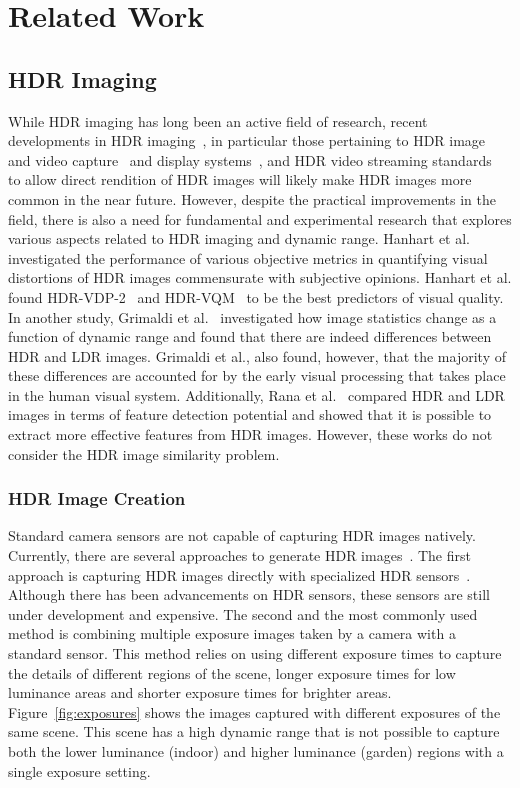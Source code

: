\chapter{Related Work}
\label{chp:b2}

\section{HDR Imaging}

While HDR imaging has long been an active field of research, recent developments in HDR imaging~\cite{Rein2010,Banterle2011,chalmers2016high}, in particular those pertaining to HDR image and video capture~\cite{tocci2011versatile,froehlich2014creating} and display systems~\cite{seetzen2004high}, and HDR
video streaming standards~\cite{standard2016dynamic} to allow direct rendition of HDR images will likely make HDR images more common in the near future. However, despite the practical improvements in the field, there is also a need for fundamental and experimental research that explores various aspects related to HDR imaging and dynamic range. Hanhart et al.~\cite{hanhart2015benchmarking} investigated the performance of various objective metrics in quantifying visual distortions of HDR images commensurate with subjective opinions. Hanhart et al. found HDR-VDP-2~\cite{mantiuk2011hdr} and HDR-VQM~\cite{narwaria2015hdr} to be the best predictors of visual quality. In another study, Grimaldi et al.~\cite{grimaldi2019statistics} investigated how image statistics change as a function of dynamic range and found that there are indeed differences between HDR and LDR images. Grimaldi et al., also found, however, that the majority of these differences are accounted for by the early visual processing that takes place in the human visual system. Additionally, Rana et al.~\cite{rana2015evaluation} compared HDR and LDR images in terms of feature detection potential and showed that it is possible to extract more effective features from HDR images. However, these works do not consider the HDR image similarity problem.

\subsection{HDR Image Creation}
Standard camera sensors are not capable of capturing HDR images natively. Currently, there are several approaches to generate HDR images~\cite{banterle2017advanced}. The first approach is capturing HDR images directly with specialized HDR sensors~\cite{zhao2015unbounded}. Although there has been advancements on HDR sensors, these sensors are still under development and expensive. The second and the most commonly used method is combining multiple exposure images taken by a camera with a standard sensor. This method relies on using different exposure times to capture the details of different regions of the scene, longer exposure times for low luminance areas and shorter exposure times for brighter areas. Figure~\ref{fig:exposures} shows the images captured with different exposures of the same scene. This scene has a high dynamic range that is not possible to capture both the lower luminance (indoor) and higher luminance (garden) regions with a single exposure setting.

